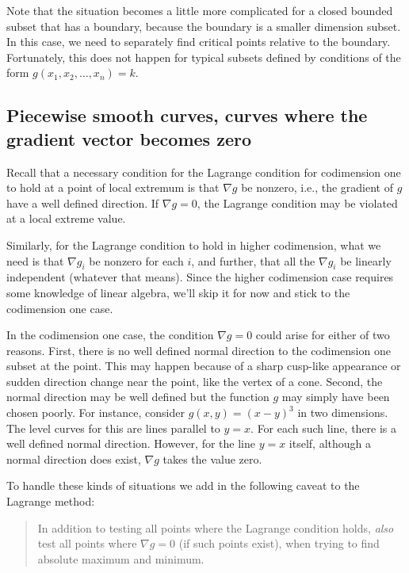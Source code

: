 \documentclass[10pt]{amsart}
\begin{document}
Note that the situation becomes a little more complicated for a closed
bounded subset that has a boundary, because the boundary is a smaller
dimension subset. In this case, we need to separately find critical
points relative to the boundary. Fortunately, this does not happen for
typical subsets defined by conditions of the form
$g(x_1,x_2,\dots,x_n) = k$.

\subsection{Piecewise smooth curves, curves where the gradient vector becomes zero}

Recall that a necessary condition for the Lagrange condition for
codimension one to hold at a point of local extremum is that $\nabla g$
be nonzero, i.e., the gradient of $g$ have a well defined
direction. If $\nabla g = 0$, the Lagrange condition may be violated
at a local extreme value.

Similarly, for the Lagrange condition to hold in higher codimension,
what we need is that $\nabla g_i$ be nonzero for each $i$, and
further, that all the $\nabla g_i$ be linearly independent (whatever
that means). Since the higher codimension case requires some knowledge
of linear algebra, we'll skip it for now and stick to the codimension
one case.

In the codimension one case, the condition $\nabla g = 0$ could arise
for either of two reasons. First, there is no well defined normal
direction to the codimension one subset at the point. This may happen
because of a sharp cusp-like appearance or sudden direction change
near the point, like the vertex of a cone. Second, the normal
direction may be well defined but the function $g$ may simply have
been chosen poorly. For instance, consider $g(x,y) = (x - y)^3$ in two
dimensions. The level curves for this are lines parallel to $y =
x$. For each such line, there is a well defined normal
direction. However, for the line $y = x$ itself, although a normal
direction does exist, $\nabla g$ takes the value zero.

To handle these kinds of situations we add in the following caveat to
the Lagrange method:

\begin{quote}
  In addition to testing all points where the Lagrange condition
  holds, {\em also} test all points where $\nabla g = 0$ (if such
  points exist), when trying to find absolute maximum and minimum.
\end{quote}
\end{document}
